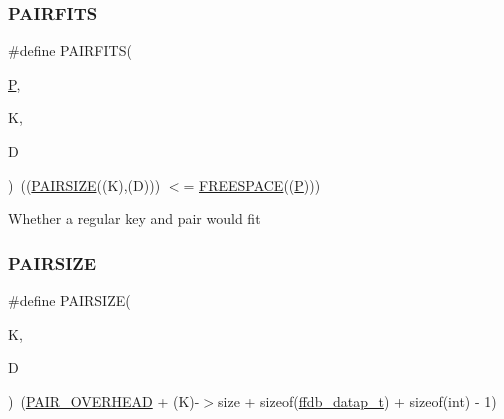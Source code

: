 \subsubsection{\texorpdfstring{PAIRFITS}{PAIRFITS}\hspace{0.1cm}{\footnotesize\ttfamily [2/2]}}
{\footnotesize\ttfamily \#define P\+A\+I\+R\+F\+I\+TS(\begin{DoxyParamCaption}\item[{}]{\mbox{\hyperlink{adat__devel_2lib_2hadron_2operator__name__util_8cc_aef94be98e2c9e4a4dece75f60ca9792c}{P}},  }\item[{}]{K,  }\item[{}]{D }\end{DoxyParamCaption})~((\mbox{\hyperlink{adat__devel_2other__libs_2filedb_2filehash_2ffdb__page_8h_a63e9de9a7b2aeec52d911f3e884e8365}{P\+A\+I\+R\+S\+I\+ZE}}((K),(D))) $<$= \mbox{\hyperlink{adat__devel_2other__libs_2filedb_2filehash_2ffdb__page_8h_a6774480bfaf9d831352ae726a66a5465}{F\+R\+E\+E\+S\+P\+A\+CE}}((\mbox{\hyperlink{adat__devel_2lib_2hadron_2operator__name__util_8cc_aef94be98e2c9e4a4dece75f60ca9792c}{P}})))}

Whether a regular key and pair would fit \mbox{\label{adat-devel_2other__libs_2filedb_2filehash_2ffdb__page_8h_a63e9de9a7b2aeec52d911f3e884e8365}} 
\subsubsection{\texorpdfstring{PAIRSIZE}{PAIRSIZE}}
{\footnotesize\ttfamily \#define P\+A\+I\+R\+S\+I\+ZE(\begin{DoxyParamCaption}\item[{}]{K,  }\item[{}]{D }\end{DoxyParamCaption})~(\mbox{\hyperlink{adat__devel_2other__libs_2filedb_2filehash_2ffdb__page_8h_a1ac84ac56af664b2575aebd50f2c54bf}{P\+A\+I\+R\+\_\+\+O\+V\+E\+R\+H\+E\+AD}} + (K)-\/$>$size + sizeof(\mbox{\hyperlink{adat-devel_2other__libs_2filedb_2filehash_2ffdb__page_8h_af1593018f0ec0e6539abbf3de31870e6}{ffdb\+\_\+datap\+\_\+t}}) + sizeof(int) -\/ 1)}

\mbox{\label{adat-devel_2other__libs_2filedb_2filehash_2ffdb__page_8h_a9f3ec51602d190743b13ac9322bea011}} 
